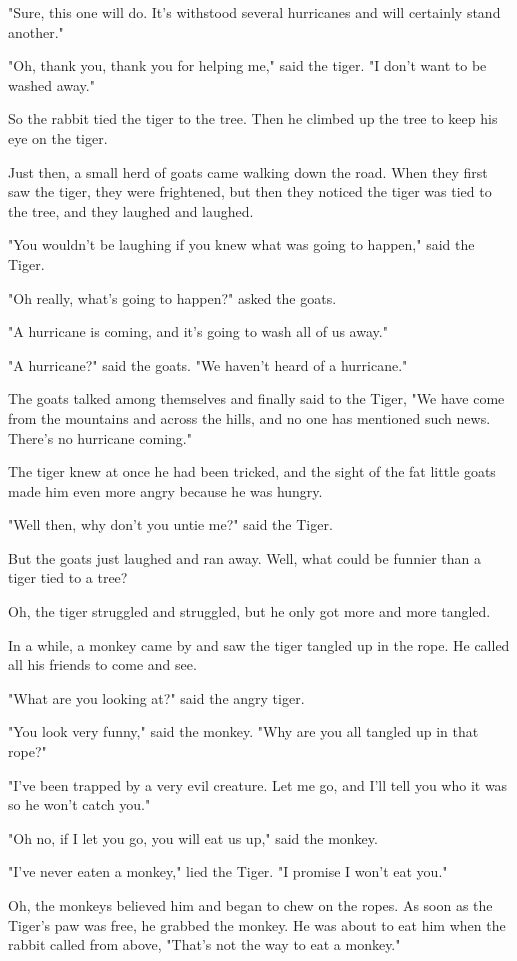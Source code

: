 "Sure, this one will do. It's withstood several hurricanes and will certainly stand another."

"Oh, thank you, thank you for helping me," said the tiger. "I don't want to be washed away."

So the rabbit tied the tiger to the tree. Then he climbed up the tree to keep his eye on the tiger.

Just then, a small herd of goats came walking down the road. When they first saw the tiger, they were frightened, but then they noticed the tiger was tied to the tree, and they laughed and laughed.

"You wouldn't be laughing if you knew what was going to happen," said the Tiger.

"Oh really, what's going to happen?" asked the goats.

"A hurricane is coming, and it's going to wash all of us away."

"A hurricane?" said the goats. "We haven't heard of a hurricane."

The goats talked among themselves and finally said to the Tiger, "We have come from the mountains and across the hills, and no one has mentioned such news. There's no hurricane coming."

The tiger knew at once he had been tricked, and the sight of the fat little goats made him even more angry because he was hungry.

"Well then, why don't you untie me?" said the Tiger.

But the goats just laughed and ran away. Well, what could be funnier than a tiger tied to a tree?

Oh, the tiger struggled and struggled, but he only got more and more tangled.

In a while, a monkey came by and saw the tiger tangled up in the rope. He called all his friends to come and see.

"What are you looking at?" said the angry tiger.

"You look very funny," said the monkey. "Why are you all tangled up in that rope?"

"I've been trapped by a very evil creature. Let me go, and I'll tell you who it was so he won't catch you."

"Oh no, if I let you go, you will eat us up," said the monkey.

"I've never eaten a monkey," lied the Tiger. "I promise I won't eat you."

Oh, the monkeys believed him and began to chew on the ropes. As soon as the Tiger's paw was free, he grabbed the monkey. He was about to eat him when the rabbit called from above, "That's not the way to eat a monkey."

